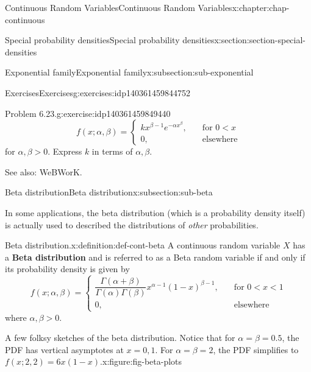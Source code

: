 \documentclass[oneside,10pt,]{book}
\newcommand{\terminology}[1]{\textbf{#1}}
\numberwithin{equation}{section}
\newcommand{\lt}{<}
\newcommand{\gt}{>}
\newcommand{\amp}{&}
\begin{document}
\begin{chapterptx}{Continuous Random Variables}{}{Continuous Random Variables}{}{}{x:chapter:chap-continuous}
\begin{sectionptx}{Special probability densities}{}{Special probability densities}{}{}{x:section:section-special-densities}
\begin{subsectionptx}{Exponential family}{}{Exponential family}{}{}{x:subsection:sub-exponential}
\begin{exercises-subsubsection}{Exercises}{}{Exercises}{}{}{g:exercises:idp140361459844752}
\begin{divisionexercise}{2}{Problem 6.23.}{}{g:exercise:idp140361459849440}
\begin{equation*}
f(x; \alpha, \beta) =
\begin{cases}kx^{\beta-1}e^{-\alpha x^\beta}, \amp \quad
\text{
for }0 \lt x\\0, \amp \quad \text{elsewhere}\end{cases}
\end{equation*}
for \(\alpha, \beta \gt 0\).  Express \(k\) in terms of \(\alpha,
\beta\).%
\end{divisionexercise}%
See also: WeBWorK.%
\end{exercises-subsubsection}
\end{subsectionptx}
%
%
\typeout{************************************************}
\typeout{************************************************}
%
\begin{subsectionptx}{Beta distribution}{}{Beta distribution}{}{}{x:subsection:sub-beta}
\begin{introduction}{}%
In some applications, the beta distribution (which is a probability density itself) is actually used to described the distributions of \emph{other} probabilities.%
\end{introduction}%
\begin{definition}{Beta distribution.}{x:definition:def-cont-beta}%
A continuous random variable \(\displaystyle X\) has a \terminology{Beta distribution} and is referred to as a Beta random variable if and only if its probability density is given by%
\begin{equation*}
f(x; \alpha, \beta) =
\begin{cases}\dfrac{\Gamma(\alpha+\beta)}{\Gamma(\alpha)\Gamma(\beta)}x^
{\alpha-1}(1-x)^{\beta-1}, \amp \quad \text{
for }0 \lt x \lt 1\\0, \amp \quad \text{elsewhere}\end{cases}
\end{equation*}
where \(\alpha, \beta \gt 0\).%
\end{definition}
\begin{figureptx}{A few folksy sketches of the beta distribution. Notice that for \(\alpha = \beta = 0.5\), the PDF has vertical asymptotes at \(x =
0, 1\). For \(\alpha = \beta = 2\), the PDF simplifies to \(f(x; 2, 2) =
6x(1-x)\).}{x:figure:fig-beta-plots}{}%
\begin{image}{0.25}{0.5}{0.25}%

\end{image}
\end{figureptx}
\end{subsectionptx}
\end{sectionptx}
\end{chapterptx}
\end{document}
